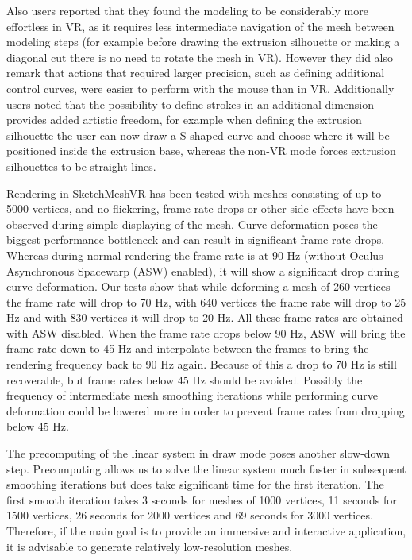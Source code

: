 Also users reported that they found the modeling to be considerably more effortless in VR, as it requires less intermediate navigation of the mesh between modeling steps (for example before drawing the extrusion silhouette or making a diagonal cut there is no need to rotate the mesh in VR). However they did also remark that actions that required larger precision, such as defining additional control curves, were easier to perform with the mouse than in VR.
Additionally users noted that the possibility to define strokes in an additional dimension provides added artistic freedom, for example when defining the extrusion silhouette the user can now draw a S-shaped curve and choose where it will be positioned inside the extrusion base, whereas the non-VR mode forces extrusion silhouettes to be straight lines. 

Rendering in SketchMeshVR has been tested with meshes consisting of up to 5000 vertices, and no flickering, frame rate drops or other side effects have been observed during simple displaying of the mesh. Curve deformation poses the biggest performance bottleneck and can result in significant frame rate drops. Whereas during normal rendering the frame rate is at 90 Hz (without Oculus Asynchronous Spacewarp (ASW) enabled), it will show a significant drop during curve deformation. Our tests show that while deforming a mesh of 260 vertices the frame rate will drop to 70 Hz, with 640 vertices the frame rate will drop to 25 Hz and with 830 vertices it will drop to 20 Hz. All these frame rates are obtained with ASW disabled. When the frame rate drops below 90 Hz, ASW will bring the frame rate down to 45 Hz and interpolate between the frames to bring the rendering frequency back to 90 Hz again. Because of this a drop to 70 Hz is still recoverable, but frame rates below 45 Hz should be avoided. Possibly the frequency of intermediate mesh smoothing iterations while performing curve deformation could be lowered more in order to prevent frame rates from dropping below 45 Hz.

The precomputing of the linear system in draw mode poses another slow-down step. Precomputing allows us to solve the linear system much faster in subsequent smoothing iterations but does take significant time for the first iteration. The first smooth iteration takes 3 seconds for meshes of 1000 vertices, 11 seconds for 1500 vertices, 26 seconds for 2000 vertices and 69 seconds for 3000 vertices. Therefore, if the main goal is to provide an immersive and interactive application, it is advisable to generate relatively low-resolution meshes.